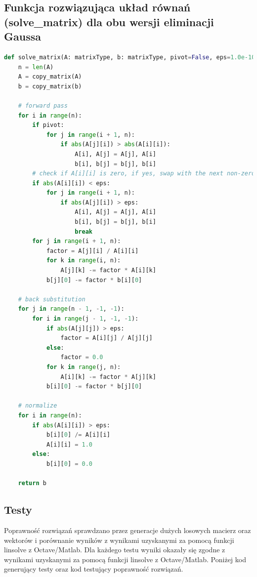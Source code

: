 \documentclass[a4paper]{article}
\begin{document}
\subsection{Funkcja rozwiązująca układ równań (solve\_matrix) dla obu wersji eliminacji Gaussa}
\begin{lstlisting}[language=python]
def solve_matrix(A: matrixType, b: matrixType, pivot=False, eps=1.0e-10):
    n = len(A)
    A = copy_matrix(A)
    b = copy_matrix(b)

    # forward pass
    for i in range(n):
        if pivot:
            for j in range(i + 1, n):
                if abs(A[j][i]) > abs(A[i][i]):
                    A[i], A[j] = A[j], A[i]
                    b[i], b[j] = b[j], b[i]
        # check if A[i][i] is zero, if yes, swap with the next non-zero row
        if abs(A[i][i]) < eps:
            for j in range(i + 1, n):
                if abs(A[j][i]) > eps:
                    A[i], A[j] = A[j], A[i]
                    b[i], b[j] = b[j], b[i]
                    break
        for j in range(i + 1, n):
            factor = A[j][i] / A[i][i]
            for k in range(i, n):
                A[j][k] -= factor * A[i][k]
            b[j][0] -= factor * b[i][0]

    # back substitution
    for j in range(n - 1, -1, -1):
        for i in range(j - 1, -1, -1):
            if abs(A[j][j]) > eps:
                factor = A[i][j] / A[j][j]
            else:
                factor = 0.0
            for k in range(j, n):
                A[i][k] -= factor * A[j][k]
            b[i][0] -= factor * b[j][0]

    # normalize
    for i in range(n):
        if abs(A[i][i]) > eps:
            b[i][0] /= A[i][i]
            A[i][i] = 1.0
        else:
            b[i][0] = 0.0

    return b

\end{lstlisting}

\subsection{Testy}

Poprawność rozwiązań sprawdzano przez generacje dużych losowych macierz oraz wektorów i porównanie wyników
z wynikami uzyskanymi za pomocą funkcji linsolve z Octave/Matlab.
Dla każdego testu wyniki okazały się zgodne z wynikami uzyskanymi za pomocą funkcji linsolve z Octave/Matlab.
Poniżej kod generujący testy oraz kod testujący poprawność rozwiązań.
\end{document}

